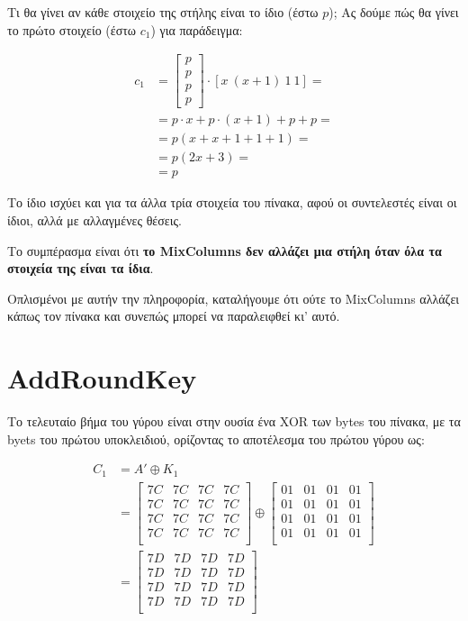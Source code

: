 \documentclass{article}
\begin{document}
Τι θα γίνει αν κάθε στοιχείο της στήλης είναι το ίδιο (έστω $p$); Ας δούμε πώς θα γίνει το πρώτο στοιχείο (έστω $c_1$) για παράδειγμα:

\begin{align*}
c_1 &= \begin{bmatrix} p \\ p \\ p \\ p \end{bmatrix} \cdot [x \ (x + 1) \ 1 \ 1] = \\
    &= p \cdot x + p \cdot (x + 1) + p + p = \\
    &= p ( x + x + 1 + 1 + 1) = \\
    &= p (2x + 3) = \\
    &= p
\end{align*}

Το ίδιο ισχύει και για τα άλλα τρία στοιχεία του πίνακα, αφού οι συντελεστές είναι οι ίδιοι, αλλά με αλλαγμένες θέσεις.

Το συμπέρασμα είναι ότι \textbf{το MixColumns δεν αλλάζει μια στήλη όταν όλα τα στοιχεία της είναι τα ίδια}.

Οπλισμένοι με αυτήν την πληροφορία, καταλήγουμε ότι ούτε το MixColumns αλλάζει κάπως τον πίνακα και συνεπώς μπορεί να παραλειφθεί κι' αυτό.

\section*{AddRoundKey}

Το τελευταίο βήμα του γύρου είναι στην ουσία ένα XOR των bytes του πίνακα, με τα byets του πρώτου υποκλειδιού, ορίζοντας το αποτέλεσμα του πρώτου γύρου ως:

\begin{align*}
C_1 &= A' \oplus K_1 \\
    &=
    \begin{bmatrix}
    7C & 7C & 7C & 7C \\
    7C & 7C & 7C & 7C \\
    7C & 7C & 7C & 7C \\
    7C & 7C & 7C & 7C \\
    \end{bmatrix} \oplus
    \begin{bmatrix}
    01 & 01 & 01 & 01 \\
    01 & 01 & 01 & 01 \\
    01 & 01 & 01 & 01 \\
    01 & 01 & 01 & 01 \\
    \end{bmatrix} \\
    &=
    \begin {bmatrix}
    7D & 7D & 7D & 7D \\
    7D & 7D & 7D & 7D \\
    7D & 7D & 7D & 7D \\
    7D & 7D & 7D & 7D \\
    \end {bmatrix}
\end{align*}
\end{document}
